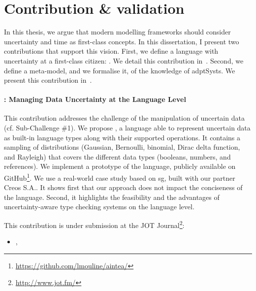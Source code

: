 \section{Contribution \& validation}
\label{sec:intro:contrib}

In this thesis, we argue that modern modelling frameworks should consider uncertainty and time as first-class concepts.
In this dissertation, I present two contributions that support this vision.
First, we define a language with uncertainty at a first-class citizen: \langName.
We detail this contribution in~.
Second, we define a meta-model, and we formalise it, of the knowledge of \glspl{adptSyst}.
We present this contribution in~.

\paragraph{\langName{}: Managing Data Uncertainty at the Language Level}
This contribution addresses the challenge of the manipulation of uncertain data (cf. Sub-Challenge \#1). %
 We propose \langName{}, a language able to represent uncertain data as built-in language types along with their supported operations. 
 It contains a sampling of distributions (Gaussian, Bernoulli, binomial, Dirac delta function, and Rayleigh) that covers the different data types (booleans, numbers, and references).
 We implement a prototype of the language, publicly available on GitHub\footnote{\url{https://github.com/lmouline/aintea/}}.
 We use a real-world case study based on \gls{sg}, built with our partner Creos S.A..
It shows first that our approach does not impact the conciseness of the language.
Second, it highlights the feasibility and the advantages of uncertainty-aware type checking systems on the language level.

This contribution is under submission at the JOT Journal\footnote{\url{http://www.jot.fm/}}:
\begin{itemize}
	\item {}, \citeauthor{insubmission:2019:comlan:datauncertainty}
\end{itemize}

